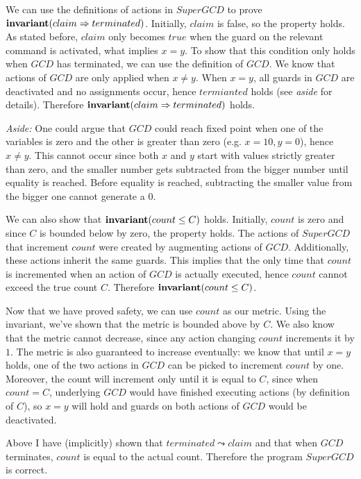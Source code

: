 \documentclass[10pt,letter]{article}
\begin{document}
We can use the definitions of actions in $SuperGCD$ to prove ${\textbf{\textrm{invariant}}(claim \Rightarrow terminated)}$. Initially, $claim$ is false, so the property holds. As stated before, $claim$ only becomes $true$ when the guard on the relevant command is activated, what implies $x = y$. To show that this condition only holds when $GCD$ has terminated, we can use the definition of $GCD$. We know that actions of $GCD$ are only applied when $x \neq y$. When $x = y$, all guards in $GCD$ are deactivated and no assignments occur, hence $termianted$ holds (see \textit{aside} for details). Therefore ${\textbf{\textrm{invariant}}(claim \Rightarrow terminated)}$ holds.

\textit{Aside:} One could argue that $GCD$ could reach fixed point when one of the variables is zero and the other is greater than zero (e.g. $x = 10, y = 0$), hence $x \neq y$. This cannot occur since both $x$ and $y$ start with values strictly greater than zero, and the smaller number gets subtracted from the bigger number until equality is reached. Before equality is reached, subtracting the smaller value from the bigger one cannot generate a $0$.

We can also show that ${\textbf{\textrm{invariant}}(count \leq C)}$ holds. Initially, $count$ is zero and since $C$ is bounded below by zero, the property holds. The actions of $SuperGCD$ that increment $count$ were created by augmenting actions of $GCD$. Additionally, these actions inherit the same guards. This implies that the only time that $count$ is incremented when an action of $GCD$ is actually executed, hence $count$ cannot exceed the true count $C$. Therefore ${\textbf{\textrm{invariant}}(count \leq C)}$.

Now that we have proved safety, we can use $count$ as our metric. Using the invariant, we've shown that the metric is bounded above by $C$. We also know that the metric cannot decrease, since any action changing $count$ increments it by $1$. The metric is also guaranteed to increase eventually: we know that until $x = y$ holds, one of the two actions in $GCD$ can be picked to increment $count$ by one. Moreover, the count will increment only until it is equal to $C$, since when $count = C$, underlying $GCD$ would have finished executing actions (by definition of $C$), so $x = y$ will hold and guards on both actions of $GCD$ would be deactivated.

Above I have (implicitly) shown that $terminated \leadsto claim$ and that when $GCD$ terminates, $count$ is equal to the actual count. Therefore the program $SuperGCD$ is correct.
\end{document}
